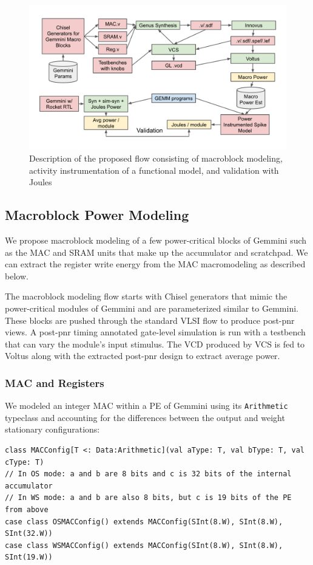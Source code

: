 \documentclass[sigconf]{acmart}
\begin{document}
\begin{figure}
  \begin{center}
    \includegraphics[width=\linewidth]{overall_flow.pdf}
  \end{center}
  \caption{Description of the proposed flow consisting of macroblock modeling, activity instrumentation of a functional model, and validation with Joules}
\end{figure}

\subsection{Macroblock Power Modeling}
We propose macroblock modeling of a few power-critical blocks of Gemmini such as the MAC and SRAM units that make up the accumulator and scratchpad.
We can extract the register write energy from the MAC macromodeling as described below.

The macroblock modeling flow starts with Chisel generators that mimic the power-critical modules of Gemmini and are parameterized similar to Gemmini.
These blocks are pushed through the standard VLSI flow to produce post-pnr views.
A post-pnr timing annotated gate-level simulation is run with a testbench that can vary the module's input stimulus.
The VCD produced by VCS is fed to Voltus along with the extracted post-pnr design to extract average power.

\subsubsection{MAC and Registers}
We modeled an integer MAC within a PE of Gemmini using its \texttt{Arithmetic} typeclass and accounting for the differences between the output and weight stationary configurations:

\begin{verbatim}
class MACConfig[T <: Data:Arithmetic](val aType: T, val bType: T, val cType: T)
// In OS mode: a and b are 8 bits and c is 32 bits of the internal accumulator
// In WS mode: a and b are also 8 bits, but c is 19 bits of the PE from above
case class OSMACConfig() extends MACConfig(SInt(8.W), SInt(8.W), SInt(32.W))
case class WSMACConfig() extends MACConfig(SInt(8.W), SInt(8.W), SInt(19.W))
\end{verbatim}
\end{document}

